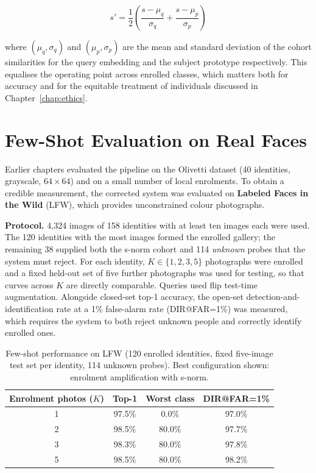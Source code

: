 \documentclass[12pt,a4paper]{report}
\begin{document}
\begin{equation}
  s' = \frac{1}{2}\left(\frac{s - \mu_q}{\sigma_q} + \frac{s - \mu_p}{\sigma_p}\right)
  \label{eq:snorm}
\end{equation}

where $(\mu_q, \sigma_q)$ and $(\mu_p, \sigma_p)$ are the mean and standard
deviation of the cohort similarities for the query embedding and the subject
prototype respectively. This equalises the operating point across enrolled
classes, which matters both for accuracy and for the equitable treatment of
individuals discussed in Chapter~\ref{chap:ethics}.

\section{Few-Shot Evaluation on Real Faces}
\label{sec:fewshot-eval}

Earlier chapters evaluated the pipeline on the Olivetti dataset (40 identities,
grayscale, $64\times64$) and on a small number of local enrolments. To obtain a
credible measurement, the corrected system was evaluated on
\textbf{Labeled Faces in the Wild} (LFW), which provides unconstrained colour
photographs.

\textbf{Protocol.} 4{,}324 images of 158 identities with at least ten images each
were used. The 120 identities with the most images formed the enrolled gallery;
the remaining 38 supplied both the s-norm cohort and 114 \emph{unknown} probes
that the system must reject. For each identity, $K \in \{1,2,3,5\}$ photographs
were enrolled and a fixed held-out set of five further photographs was used for
testing, so that curves across $K$ are directly comparable. Queries used flip
test-time augmentation. Alongside closed-set top-1 accuracy, the open-set
detection-and-identification rate at a 1\% false-alarm rate (DIR@FAR=1\%) was
measured, which requires the system to both reject unknown people and correctly
identify enrolled ones.

\begin{table}[H]
  \centering
  \caption{Few-shot performance on LFW (120 enrolled identities, fixed five-image
  test set per identity, 114 unknown probes). Best configuration shown:
  enrolment amplification with s-norm.}
  \label{tab:fewshot}
  \begin{tabular}{cccc}
    \toprule
    \textbf{Enrolment photos ($K$)} & \textbf{Top-1} & \textbf{Worst class} & \textbf{DIR@FAR=1\%} \\
    \midrule
    1 & 97.5\% & 0.0\%  & 97.0\% \\
    2 & 98.5\% & 80.0\% & 97.7\% \\
    3 & 98.3\% & 80.0\% & 97.8\% \\
    5 & 98.5\% & 80.0\% & 98.2\% \\
    \bottomrule
  \end{tabular}
\end{table}
\end{document}
